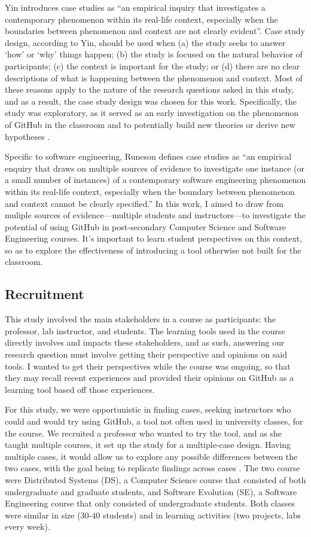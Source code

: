 Yin \cite{yin2013case} introduces case studies as ``an empirical inquiry that investigates a contemporary phenomenon within its real-life context, especially when the boundaries between phenomenon and context are not clearly evident''. Case study design, according to Yin, should be used when (a) the study seeks to answer `how' or `why' things happen; (b) the study is focused on the natural behavior of participants; (c) the context is important for the study; or (d) there are no clear descriptions of what is happening between the phenomenon and context. Most of these reasons apply to the nature of the research questions asked in this study, and as a result, the case study design was chosen for this work. Specifically, the study was exploratory, as it served as an early investigation on the phenomenon of GitHub in the classroom and to potentially build new theories or derive new hypotheses \cite{easterbrook2008selecting}.

Specific to software engineering, Runeson \cite{runeson2012case} defines case studies as ``an empirical enquiry that draws on multiple sources of evidence to investigate one instance (or a small number of instances) of a contemporary software engineering phenomenon within its real-life context, especially when the boundary between phenomenon and context cannot be clearly specified.'' In this work, I aimed to draw from muliple sources of evidence---multiple students and instructors---to investigate the potential of using GitHub in post-secondary Computer Science and Software Engineering courses. It's important to learn student perspectives on this context, so as to explore the effectiveness of introducing a tool otherwise not built for the classroom.

\subsection{Recruitment}
This study involved the main stakeholders in a course as participants: the professor, lab instructor, and students. The learning tools used in the course directly involves and impacts these stakeholders, and as such, answering our research question must involve getting their perspective and opinions on said tools. I wanted to get their perspectives while the course was ongoing, so that they may recall recent experiences and provided their opinions on GitHub as a learning tool based off those experiences.

For this study, we were opportunistic in finding cases, seeking instructors who could and would try using GitHub, a tool not often used in university classes, for the course. We recruited a professor who wanted to try the tool, and as she taught multiple courses, it set up the study for a multiple-case design. Having multiple cases, it would allow us to explore any possible differences between the two cases, with the goal being to replicate findings across cases \cite{yin2013case}. The two course were Distributed Systems (DS), a Computer Science course that consisted of both undergraduate and graduate students, and Software Evolution (SE), a Software Engineering course that only consisted of undergraduate students. Both classes were similar in size (30-40 students) and in learning activities (two projects, labs every week).

